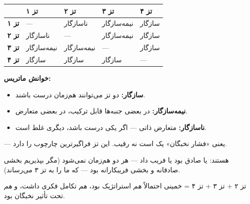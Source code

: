 \begin{principleBox}
\begin{longtable}{%
    >{\centering\arraybackslash}p{}
    >{\centering\arraybackslash}p{}
    >{\centering\arraybackslash}p{}
    >{\centering\arraybackslash}p{}
    >{\centering\arraybackslash}p{}}
\toprule
\rowcolor{cPrimary!10}
& \cellcolor{cGreen!15}\textbf{تز ۱} & \cellcolor{cAccent!10}\textbf{تز ۲} & \cellcolor{cGold!15}\textbf{تز ۳} & \cellcolor{cConsolid!10}\textbf{تز ۴} \\
\midrule

\cellcolor{cGreen!15}\textbf{تز ۱} & — & \textcolor{cAccent}{ناسازگار} & \textcolor{cGold}{نیمه‌سازگار} & \textcolor{cGreen}{سازگار} \\
\midrule
\cellcolor{cAccent!10}\textbf{تز ۲} & \textcolor{cAccent}{ناسازگار} & — & \textcolor{cGold}{نیمه‌سازگار} & \textcolor{cGreen}{سازگار} \\
\midrule
\cellcolor{cGold!15}\textbf{تز ۳} & \textcolor{cGold}{نیمه‌سازگار} & \textcolor{cGold}{نیمه‌سازگار} & — & \textcolor{cGreen}{سازگار} \\
\midrule
\cellcolor{cConsolid!10}\textbf{تز ۴} & \textcolor{cGreen}{سازگار} & \textcolor{cGreen}{سازگار} & \textcolor{cGreen}{سازگار} & — \\

\bottomrule
\end{longtable}

\textbf{خوانش ماتریس:}
\begin{itemize}[label=\textcolor{cPrimary}{$\bullet$}, rightmargin=2em]
    \item \textcolor{cGreen}{\textbf{سازگار:}} دو تز می‌توانند هم‌زمان درست باشند.
    \item \textcolor{cGold}{\textbf{نیمه‌سازگار:}} در بعضی جنبه‌ها قابل ترکیب، در بعضی متعارض.
    \item \textcolor{cAccent}{\textbf{ناسازگار:}} متعارض ذاتی — اگر یکی درست باشد، دیگری غلط است.
\end{itemize}
\end{principleBox}

\begin{noteBox}
 — یعنی «فشار نخبگان» یک  است نه رقیب. این تز فراگیرترین چارچوب را دارد.

 هستند: یا صادق بود یا فریب داد — هر دو هم‌زمان نمی‌شود (مگر بپذیریم بخشی صادقانه و بخشی فریبکارانه بود — که ما را به تز ۳ می‌رساند).

 تز ۲ + تز ۳ + تز ۴ = خمینی احتمالاً \textit{هم} استراتژیک بود، \textit{هم} تکامل فکری داشت، و \textit{هم} تحت تأثیر نخبگان بود.
\end{noteBox}

